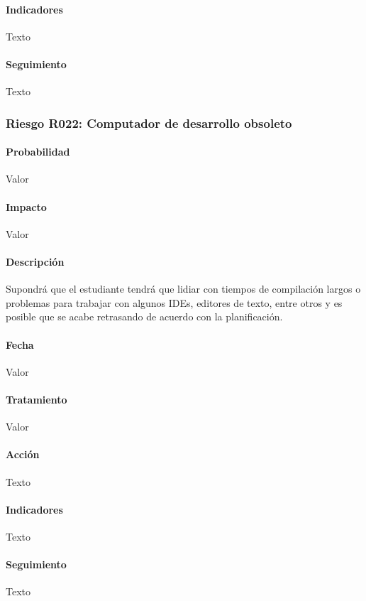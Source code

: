 \documentclass[10pt,a4paper]{article}
\begin{document}
				\paragraph{Indicadores} Texto %
				\paragraph{Seguimiento}	Texto %
				\subsubsection{Riesgo R022: Computador de desarrollo obsoleto}
				\paragraph{Probabilidad} Valor
				\paragraph{Impacto}	Valor
				\paragraph{Descripción} Supondrá que el estudiante tendrá que lidiar con tiempos de compilación largos o problemas para trabajar con algunos IDEs, editores de texto, entre otros y es posible que se acabe retrasando de acuerdo con la planificación.
				\paragraph{Fecha} Valor %
				\paragraph{Tratamiento} Valor %
				\paragraph{Acción} Texto %
				\paragraph{Indicadores} Texto %
				\paragraph{Seguimiento}	Texto %
\end{document}
